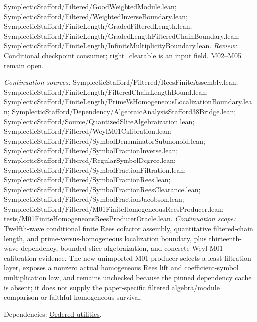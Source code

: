 SymplecticStafford/Filtered/GoodWeightedModule.lean; SymplecticStafford/Filtered/WeightedInverseBoundary.lean; SymplecticStafford/FiniteLength/GradedFilteredLength.lean; SymplecticStafford/FiniteLength/GradedLengthFilteredChainBoundary.lean; SymplecticStafford/FiniteLength/InfiniteMultiplicityBoundary.lean.
\emph{Review:} Conditional checkpoint consumer; right\_clearable is an input field. M02–M05 remain open.

\emph{Continuation sources:} SymplecticStafford/Filtered/ReesFiniteAssembly.lean; SymplecticStafford/FiniteLength/FilteredChainLengthBound.lean; SymplecticStafford/FiniteLength/PrimeVsHomogeneousLocalizationBoundary.lean; SymplecticStafford/Dependency/AlgebraicAnalysisStafford38Bridge.lean; SymplecticStafford/Source/QuantizedSliceAlgebraization.lean; SymplecticStafford/Filtered/WeylM01Calibration.lean; SymplecticStafford/Filtered/SymbolDenominatorSubmonoid.lean; SymplecticStafford/Filtered/SymbolFractionInverse.lean; SymplecticStafford/Filtered/RegularSymbolDegree.lean; SymplecticStafford/Filtered/SymbolFractionFiltration.lean; SymplecticStafford/Filtered/SymbolFractionRees.lean; SymplecticStafford/Filtered/SymbolFractionReesClearance.lean; SymplecticStafford/Filtered/SymbolFractionJacobson.lean; SymplecticStafford/Filtered/M01FiniteHomogeneousReesProducer.lean; tests/M01FiniteHomogeneousReesProducerOracle.lean.
\emph{Continuation scope:} Twelfth-wave conditional finite Rees cofactor assembly, quantitative filtered-chain length, and prime-versus-homogeneous localization boundary, plus thirteenth-wave dependency, bounded slice-algebraization, and concrete Weyl M01 calibration evidence. The new unimported M01 producer selects a least filtration layer, exposes a nonzero actual homogeneous Rees lift and coefficient-symbol multiplication law, and remains unchecked because the pinned dependency cache is absent; it does not supply the paper-specific filtered algebra/module comparison or faithful homogeneous survival.

Dependencies: \hyperlink{claim:ordered}{Ordered utilities}.
